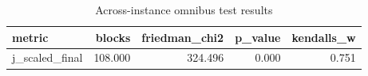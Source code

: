 \begin{table}[!t]
\centering
\caption{Across-instance omnibus test results}
\label{tab:friedman_omnibus_generated}
\begin{tabular}{lrrrr}
\toprule
metric & blocks & friedman_chi2 & p_value & kendalls_w \\
\midrule
j_scaled_final & 108.000 & 324.496 & 0.000 & 0.751 \\
\bottomrule
\end{tabular}

\end{table}